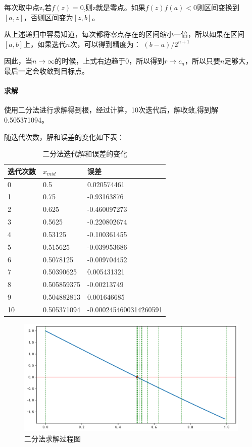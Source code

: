 每次取中点z,若$f(z)=0$,则z就是零点。如果$f(z)f(a)<0$则区间变换到$[a,z]$，否则区间变为$[z,b]$。

从上述递归中容易知道，每次都将零点存在的区间缩小一倍，所以如果在区间$[a,b]$上，如果迭代$n$次，可以得到精度为：
$(b-a)/2^{n+1} $

因此，当$n\rightarrow \infty $的时候，上式右边趋于0，所以得到$r→c_n$，所以只要$n$足够大， 最后一定会收敛到目标点。


\paragraph{求解}

使用二分法进行求解得到根，经过计算，10次迭代后，解收敛,得到解0.505371094。

随迭代次数，解和误差的变化如下表：
\begin{table}[H]
	\centering
	\caption{二分法迭代解和误差的变化}
	\begin{tabular}{lll}
		\hline
		迭代次数 & $x_{mid}$          & 误差                   \\ \hline
		0  & 0.5         & 0.020574461             \\
		1  & 0.75        & -0.93163876             \\
		2  & 0.625       & -0.460097273            \\
		3  & 0.5625      & -0.220802674            \\
		4  & 0.53125     & -0.100361455            \\
		5  & 0.515625    & -0.039953686            \\
		6  & 0.5078125   & -0.009704452            \\
		7  & 0.50390625  & 0.005431321             \\
		8  & 0.505859375 & -0.00213749             \\
		9  & 0.504882813 & 0.001646685             \\
		10 & 0.505371094 & -0.0002454600314260591 \\ \hline
	\end{tabular}
\end{table}

\begin{figure}[H]
	\centering
	\caption{二分法求解过程图}
	\includegraphics[width=\linewidth]{2-2-1.pdf}
\end{figure}

